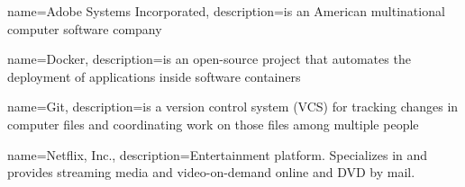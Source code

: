 {
	name={Adobe Systems Incorporated},
	description={is an American multinational computer software company \cite{bib:adobe}}
}

{
	name={Docker},
	description={is an open-source project that automates the deployment of applications inside software containers \cite{bib:docker}}
}

{
	name={Git},
	description={is a version control system (VCS) for tracking changes in computer files and coordinating work on those files among multiple people}
}

{
	name={Netflix, Inc.},
	description={Entertainment platform. Specializes in and provides streaming media and video-on-demand online and DVD by mail. \cite{bib:netflix}}
}